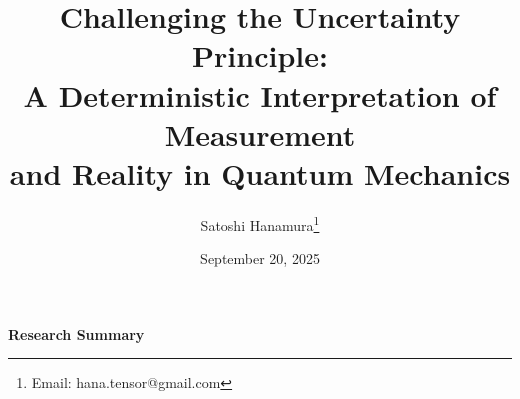 \documentclass[12pt,letterpaper]{article} %
\begin{document}
\title{Challenging the Uncertainty Principle:\\ A Deterministic Interpretation of Measurement\\ and Reality in Quantum Mechanics}

\author{Satoshi Hanamura\thanks{Email: hana.tensor@gmail.com}}
\date{September 20, 2025}

\maketitle

\tableofcontents

\vspace{0.5cm} %


\begin{center}
\textbf{Research Summary}
\end{center}
\end{document}
